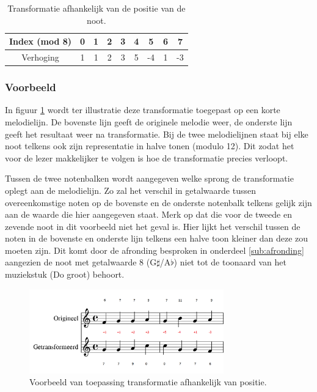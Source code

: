 \begin{table}
  \centering
  \begin{tabular}{c | c c c c c c c c }
    Index (mod 8) & 0 & 1 & 2 & 3 & 4 & 5 & 6 & 7 \\
    \hline
    \hline
    Verhoging & 1 & 1 & 2 & 3 & 5 & -4 & 1 & -3 \\
  \end{tabular}
  \caption{Transformatie afhankelijk van de positie van de noot.}
  \label{tabel:transformatie1}
\end{table}

\subsubsection{Voorbeeld}
In figuur \ref{figuur:voorbeeld_transformatie_1} wordt ter illustratie deze transformatie toegepast op een korte melodielijn. De bovenste lijn geeft de originele melodie weer, de onderste lijn geeft het resultaat weer na transformatie. Bij de twee melodielijnen staat bij elke noot telkens ook zijn representatie in halve tonen (modulo 12). Dit zodat het voor de lezer makkelijker te volgen is hoe de transformatie precies verloopt. 

Tussen de twee notenbalken wordt aangegeven welke sprong de transformatie oplegt aan de melodielijn. Zo zal het verschil in getalwaarde tussen overeenkomstige noten op de bovenste en de onderste notenbalk telkens gelijk zijn aan de waarde die hier aangegeven staat. Merk op dat die voor de tweede en zevende noot in dit voorbeeld niet het geval is. Hier lijkt het verschil tussen de noten in de bovenste en onderste lijn telkens een halve toon kleiner dan deze zou moeten zijn. Dit komt door de afronding besproken in onderdeel \ref{sub:afronding} aangezien de noot met getalwaarde 8 (G$\sharp$/A$\flat$) niet tot de toonaard van het muziekstuk (Do groot) behoort.

\begin{figure}[!ht]
  \centering
  \includegraphics[width=0.75\textwidth]{3_Melodische_Transformatie/transfo1}
  \caption{Voorbeeld van toepassing transformatie afhankelijk van positie.}
  \label{figuur:voorbeeld_transformatie_1}
\end{figure}

